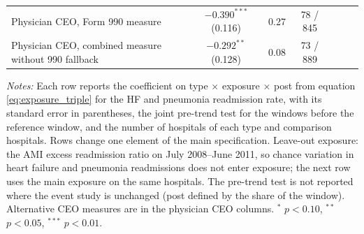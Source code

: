 \begin{table}
\begin{threeparttable}
\begin{tabular}[t]{lcccccc}
\hspace{1em}Physician CEO, Form 990 measure & $-0.390^{***}$ (0.116) & 0.27 & 78 / 845 &  &  & \\
\hspace{1em}Physician CEO, combined measure without 990 fallback & $-0.292^{**}$ (0.128) & 0.08 & 73 / 889 &  &  & \\
\bottomrule
\end{tabular}
\begin{tablenotes}[flushleft]
\footnotesize
\item \textit{Notes:} Each row reports the coefficient on type $\times$ exposure $\times$ post from equation \eqref{eq:exposure_triple} for the HF and pneumonia readmission rate, with its standard error in parentheses, the joint pre-trend test for the windows before the reference window, and the number of hospitals of each type and comparison hospitals. Rows change one element of the main specification. Leave-out exposure: the AMI excess readmission ratio on July 2008--June 2011, so chance variation in heart failure and pneumonia readmissions does not enter exposure; the next row uses the main exposure on the same hospitals. The pre-trend test is not reported where the event study is unchanged (post defined by the share of the window). Alternative CEO measures are in the physician CEO columns. $^{*}$ $p<0.10$, $^{**}$ $p<0.05$, $^{***}$ $p<0.01$.
\end{tablenotes}
\end{threeparttable}
\end{table}
